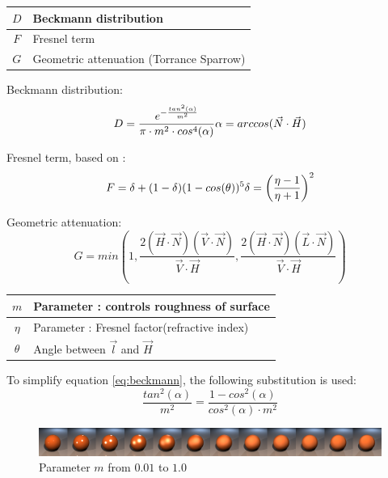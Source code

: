 \documentclass[11pt,a4paper]{article}
\begin{document}
\begin{table}[H]
\begin{tabular}{| c | l |}
\hline
$D$ & Beckmann distribution\\ \hline
$F$ & Fresnel term\\ \hline
$G$ & Geometric attenuation (Torrance Sparrow)\\ \hline
\end{tabular}
\end{table}
Beckmann distribution:
\begin{equation}
D = \frac{e^{-\frac{tan^2(\alpha)}{m^2}}}{\pi \cdot m^2 \cdot cos^4(\alpha)}
\label{eq:beckmann}
\\
\alpha = arccos(\vec{N} \cdot \vec{H})
\end{equation}

Fresnel term, based on \cite{Sch94}:
\begin{equation}
F = \delta + (1-\delta)(1-cos(\theta))^5 \\ \delta = \left(\frac{\eta - 1}{\eta+1}\right)^2
\end{equation}


Geometric attenuation:
\begin{equation}
G = min \left(1,\frac{2(\vec{H} \cdot \vec{N})(\vec{V} \cdot \vec{N})}{\vec{V} \cdot \vec{H}},\frac{2 (\vec{H} \cdot \vec{N})(\vec{L} \cdot \vec{N})}{\vec{V} \cdot \vec{H}}\right)
\end{equation}

\begin{table}[H]
\begin{tabular}{| c | l |}
\hline
$m$ & Parameter : controls roughness of surface\\ \hline
$\eta$  & Parameter : Fresnel factor(refractive index)\\ \hline
$\theta$  & Angle between $\vec{l}$ and $\vec{H}$\\ \hline
\end{tabular}
\end{table}
To simplify equation \ref{eq:beckmann}, the following substitution is used:
\begin{equation}
\frac{tan^2(\alpha)}{m^2} = \frac{1- cos^2(\alpha)}{cos^2(\alpha) \cdot m^2}
\end{equation}

\begin{figure}[H]
\includegraphics[width=\textwidth]{ctroughcomplete.png}
\caption{Parameter $m$ from $0.01$ to $1.0$}
\end{figure}
\end{document}
